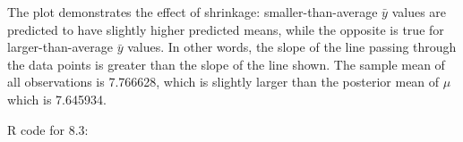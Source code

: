 \documentclass{article}
\begin{document}
\begin{enumerate}[8.1]
\begin{enumerate}[(a)]
The plot demonstrates the effect of shrinkage: smaller-than-average $\bar{y}$ values are predicted to have slightly higher predicted means, while the opposite is true for larger-than-average $\bar{y}$ values. In other words, the slope of the line passing through the data points is greater than the slope of the line shown. The sample mean of all observations is 7.766628, which is slightly larger than the posterior mean of $\mu$ which is 7.645934.

\end{enumerate}

\end{enumerate}

\pagebreak
R code for 8.3:
\end{document}
